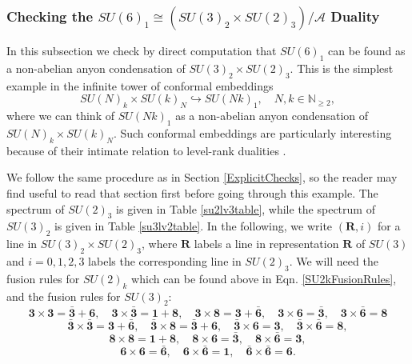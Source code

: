 \documentclass[11pt]{article}
\numberwithin{equation}{section}
\begin{document}
\subsubsection{Checking the $SU(6)_{1} \cong (SU(3)_{2} \times SU(2)_{3})/\mathcal{A}$ Duality} \label{unitaryexample}


In this subsection we check by direct computation that $SU(6)_{1}$ can be found as a non-abelian anyon condensation of $SU(3)_{2} \times SU(2)_{3}$. This is the simplest example in the infinite tower of conformal embeddings
\begin{equation}
    SU(N)_{k} \times SU(k)_{N} \hookrightarrow SU(Nk)_{1}, \quad N,k \in \mathbb{N}_{\geq 2},
\end{equation}
where we can think of $SU(Nk)_{1}$ as a non-abelian anyon condensation of $SU(N)_{k} \times SU(k)_{N}$. Such conformal embeddings are particularly interesting because of their intimate relation to level-rank dualities \cite{Hsin:2016blu}.


We follow the same procedure as in Section \ref{ExplicitChecks}, so the reader may find useful to read that section first before going through this example. The spectrum of $SU(2)_{3}$ is given in Table \ref{su2lv3table}, while the spectrum of $SU(3)_{2}$ is given in Table \ref{su3lv2table}. In the following, we write $(\mathbf{R},i)$ for a line in $SU(3)_{2} \times SU(2)_{3}$, where $\mathbf{R}$ labels a line in representation $\mathbf{R}$ of $SU(3)$ and $i=0,1,2,3$ labels the corresponding line in $SU(2)_{3}$. We will need the fusion rules for $SU(2)_{k}$ which can be found above in Eqn. \eqref{SU2kFusionRules}, and the fusion rules for $SU(3)_{2}$:
\begin{equation*}
    \mathbf{3} \times \mathbf{3} = \bar{\mathbf{3}} + \mathbf{6}, \quad \mathbf{3} \times \bar{\mathbf{3}} = \mathbf{1} + \mathbf{8}, \quad \mathbf{3} \times \mathbf{8} = \mathbf{3} + \bar{\mathbf{6}}, \quad \mathbf{3} \times \mathbf{6} = \bar{\mathbf{3}}, \quad \mathbf{3} \times \bar{\mathbf{6}} = \mathbf{8}
\end{equation*}
\begin{equation*}
    \bar{\mathbf{3}} \times \bar{\mathbf{3}} = \mathbf{3} + \bar{\mathbf{6}}, \quad \bar{\mathbf{3}} \times \mathbf{8} = \bar{\mathbf{3}} + \mathbf{6}, \quad \bar{\mathbf{3}} \times \mathbf{6} = \mathbf{3} , \quad \bar{\mathbf{3}} \times \bar{\mathbf{6}} = \mathbf{8}, 
\end{equation*}
\begin{equation*}
    \mathbf{8} \times \mathbf{8} = \mathbf{1} + \mathbf{8}, \quad \mathbf{8} \times \mathbf{6} = \bar{\mathbf{3}}, \quad \mathbf{8} \times \bar{\mathbf{6}} = \mathbf{3},
\end{equation*}
\begin{equation*}
    \mathbf{6} \times \mathbf{6} = \bar{\mathbf{6}} , \quad \mathbf{6} \times \bar{\mathbf{6}} = \mathbf{1}, \quad  \bar{\mathbf{6}} \times \bar{\mathbf{6}} = \mathbf{6}.
\end{equation*}
\end{document}
